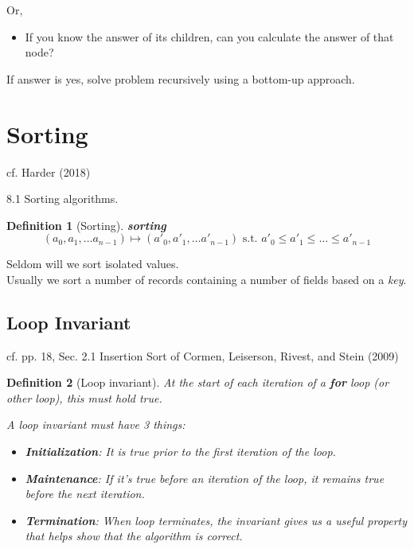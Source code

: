 \documentclass[10pt]{amsart}
\newtheorem{definition}{Definition}
\begin{document}
Or,
\begin{itemize}
	\item If you know the answer of its children, can you calculate the answer of that node?
\end{itemize}
If answer is yes, solve problem recursively using a bottom-up approach.



\section{Sorting}

cf. Harder (2018) \cite{Hard2018}

8.1 Sorting algorithms. 

\begin{definition}[Sorting]
	\textbf{sorting}
	\begin{equation}
	(a_0, a_1, \dots a_{n-1}) \mapsto (a'_0, a'_1, \dots a'_{n-1}) \text{ s.t. } a'_0 \leq a'_1 \leq \dots \leq a'_{n-1}
	\end{equation}
\end{definition}
Seldom will we sort isolated values. \\
Usually we sort a number of records containing a number of fields based on a \emph{key}. \\


\subsection{Loop Invariant}

cf. pp. 18, Sec. 2.1 Insertion Sort of Cormen, Leiserson, Rivest, and Stein (2009) \cite{CLRS2009}

\begin{definition}[Loop invariant]
	At the start of each iteration of a \textbf{for} loop (or other loop), this must hold true.
	
	A loop invariant must have 3 things:
	\begin{itemize}
		\item \textbf{Initialization}: It is true prior to the first iteration of the loop.
		\item \textbf{Maintenance}: If it's true before an iteration of the loop, it remains true before the next iteration.
		\item \textbf{Termination}: When loop terminates, the invariant gives us a useful property that helps show that the algorithm is correct.
	\end{itemize}
\end{definition}
\end{document}
